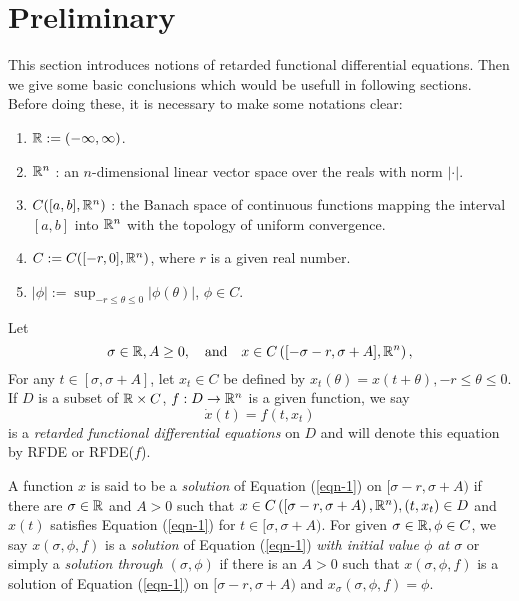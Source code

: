 \section{Preliminary}
This section introduces notions of retarded functional differential equations. Then we give some basic conclusions which would be usefull in following sections. Before doing these, it is necessary to make some notations clear:
\begin{enumerate}
  \item [] $\mathbb{R}:=(-\infty,\infty)$.
  \item [] $ \mathbb{R}^{n}$ : an $n$-dimensional linear vector space over the reals with norm $|\cdot |$.
  \item [] $C([a,b],\mathbb{R}^{n})$ : the Banach space of continuous functions mapping the interval $[a,b]$ into $\mathbb{R}^{n}$ with the topology of uniform convergence.
  \item [] $C:=C([-r,0],\mathbb{R}^{n})$, where $r$ is a given real number.
  \item [] $|\phi|:=\sup_{-r\le\theta\le 0}|\phi(\theta)|$, $\phi \in  C$.
\end{enumerate}
\begin{definition}
  Let 
  \[
    \sigma \in \mathbb{R}, A\ge 0, \quad \text{and}\quad x\in C\left( [-\sigma-r,\sigma+A],\mathbb{R}^{n} \right) 
  ,\]
  For any $t\in [\sigma,\sigma+A]$, let $x_t \in C$ be defined by $x_t(\theta)=x(t+\theta),-r\le\theta\le 0$. If $D$ is a subset of $\mathbb{R}\times C$, $f:D\to \mathbb{R}^{n}$ is a given function, we say 
  \begin{equation}\label{eqn-1}
  \dot{x}(t)=f(t,x_t)
\end{equation}
is a \textit{retarded functional differential equations} on $D$ and will denote this equation by RFDE or RFDE($f$). 
\end{definition}

\begin{definition}
  A function $x$ is said to be a \textit{solution} of Equation (\ref{eqn-1}) on $[\sigma-r,\sigma+A)$ if there are $\sigma \in \mathbb{R}$ and $A>0$ such that  $x\in C\left( [\sigma-r,\sigma+A \right) ,\mathbb{R}^{n}), (t,x_t)\in D$ and $x(t)$ satisfies Equation (\ref{eqn-1}) for $t \in [\sigma,\sigma+A)$.
  For given $\sigma \in \mathbb{R},\phi \in C$, we say $x(\sigma,\phi,f)$ is a \textit{solution} of Equation (\ref{eqn-1}) \textit{with initial value $\phi$ at $\sigma$} or simply a \textit{solution through $(\sigma,\phi)$} if there is an $A>0$ such that $x(\sigma,\phi,f)$ is a solution of Equation (\ref{eqn-1}) on $[\sigma-r,\sigma+A)$ and $x_\sigma(\sigma,\phi,f)=\phi$.
\end{definition}

